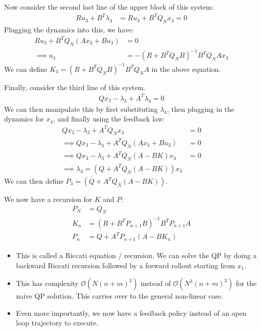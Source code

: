 \noindent
Now consider the second last line of the upper block of this system:
\begin{align}
    R u_3 + B^T \lambda_4 &= R u_3 + B^T Q_N x_4 = 0 
\end{align}
Plugging the dynamics into this, we have: 
\begin{align}
    R u_3 + B^T Q_N (A x_3 + B u_3) &= 0 \\
    \implies u_3 &= - (R + B^T Q_N B )^{-1} B^T Q_N A x_3
\end{align}
We can define $K_3 = (R + B^T Q_N B )^{-1} B^T Q_N A$ in the above equation. 

\noindent
Finally, consider the third line of this system. 
\begin{align}
    Q x_3 - \lambda_3 + A^T \lambda_4 = 0
\end{align}
We can then manipulate this by first substituting $\lambda_4$, then plugging in the dynamics for $x_4$, and finally using the feedback law:
\begin{align}
    Q x_3 - \lambda_3 + A^T Q_N x_4 &= 0 \\
    \implies Q x_3 - \lambda_3 + A^T Q_N (A x_3 + B u_3) &= 0 \\
    \implies Q x_3 - \lambda_3 + A^T Q_N (A - B K) x_3 &= 0 \\
    \implies \lambda_3 = (Q + A^T Q_N (A- BK)) x_3
\end{align}
We can then define $P_3 =  (Q + A^T Q_N (A- BK))$. 

\noindent
We now have a recursion for $K$ and $P$: 
\begin{align}
    P_N &= Q_N \\
    K_n &= (R + B^T P_{n+1} B)^{-1} B^T P_{n+1} A \\
    P_n &= Q + A^T P_{n+1} (A - BK_n)
\end{align}

\begin{itemize}
    \item This is called a Riccati equation / recursion.
    \itm We can solve the QP by doing a backward Riccati recursion followed by a forward rollout starting from $x_1$.
    \item This has complexity $\mathcal{O} (N (n+m)^3)$ instead of $\mathcal{O} (N^3 (n+m)^3)$ for the naive QP solution. 
    This carries over to the general non-linear case. 
    \item Even more importantly, we now have a feedback policy instead of an open loop trajectory to execute. 
\end{itemize}

